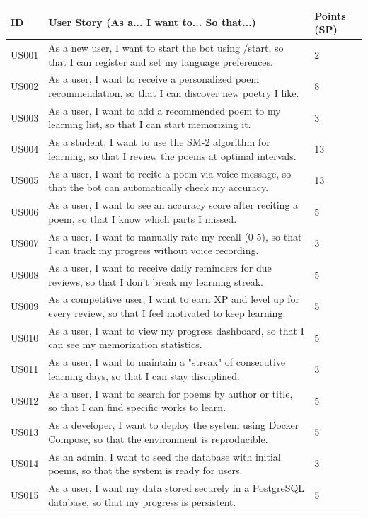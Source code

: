 \documentclass[12pt,a4paper]{article}
\begin{document}
\begin{longtable}{@{}p{}p{}p{}@{}}
\toprule
\textbf{ID} & \textbf{User Story (As a... I want to... So that...)} & \textbf{Points (SP)} \\ \midrule
US001 & As a new user, I want to start the bot using /start, so that I can register and set my language preferences. & 2 \\
US002 & As a user, I want to receive a personalized poem recommendation, so that I can discover new poetry I like. & 8 \\
US003 & As a user, I want to add a recommended poem to my learning list, so that I can start memorizing it. & 3 \\
US004 & As a student, I want to use the SM-2 algorithm for learning, so that I review the poems at optimal intervals. & 13 \\
US005 & As a user, I want to recite a poem via voice message, so that the bot can automatically check my accuracy. & 13 \\
US006 & As a user, I want to see an accuracy score after reciting a poem, so that I know which parts I missed. & 5 \\
US007 & As a user, I want to manually rate my recall (0-5), so that I can track my progress without voice recording. & 3 \\
US008 & As a user, I want to receive daily reminders for due reviews, so that I don't break my learning streak. & 5 \\
US009 & As a competitive user, I want to earn XP and level up for every review, so that I feel motivated to keep learning. & 5 \\
US010 & As a user, I want to view my progress dashboard, so that I can see my memorization statistics. & 5 \\
US011 & As a user, I want to maintain a "streak" of consecutive learning days, so that I can stay disciplined. & 3 \\
US012 & As a user, I want to search for poems by author or title, so that I can find specific works to learn. & 5 \\
US013 & As a developer, I want to deploy the system using Docker Compose, so that the environment is reproducible. & 5 \\
US014 & As an admin, I want to seed the database with initial poems, so that the system is ready for users. & 3 \\
US015 & As a user, I want my data stored securely in a PostgreSQL database, so that my progress is persistent. & 5 \\
\bottomrule
\end{longtable}
\end{document}

